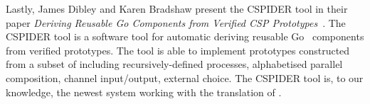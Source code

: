 Lastly, James Dibley and Karen Bradshaw present the CSPIDER tool in their paper \textit{Deriving Reusable Go Components from Verified CSP Prototypes}~\cite{Dibley2018}. The CSPIDER tool is a software tool for automatic deriving reusable Go~\cite{Go} components from verified \cspm{} prototypes. The tool is able to implement prototypes constructed from a subset of \cspm{} including recursively-defined processes, alphabetised parallel composition, channel input/output, external choice. The CSPIDER tool is, to our knowledge, the newest system working with the translation of \cspm{}.